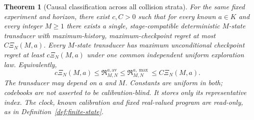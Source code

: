 \documentclass[11pt]{amsart}
\newtheorem{theorem}{Theorem}[section]
\theoremstyle{definition}\newtheorem{definition}[theorem]{Definition}
\theoremstyle{remark}\newtheorem{remark}[theorem]{Remark}
\begin{document}
\begin{theorem}[Causal classification across all collision strata]\label{thm:intrinsic-streaming}
For the same fixed experiment and horizon, there exist $c,C>0$ such that
for every known $a\in K$ and every integer $M\ge1$ there exists a
\emph{single, stage-compatible} deterministic $M$-state transducer with
maximum-history, maximum-checkpoint regret at most $C\Xi_N(M,a)$.
Every $M$-state transducer has maximum unconditional checkpoint regret at
least $c\Xi_N(M,a)$ under one common independent uniform exploration law.
Equivalently,
\begin{equation}\label{eq:intrinsic-streaming}
 c\Xi_N(M,a)\le\mathfrak R_{M,N}^{a,\mathrm{av}}
 \le\mathfrak R_{M,N}^{a,\max}\le C\Xi_N(M,a).
\end{equation}
The transducer may depend on $a$ and $M$. Constants are uniform in both;
codebooks are not asserted to be calibration-blind. It stores only its
representative index. The clock, known calibration and fixed real-valued
program are read-only, as in Definition~\ref{def:finite-state}.
\end{theorem}
\end{document}
